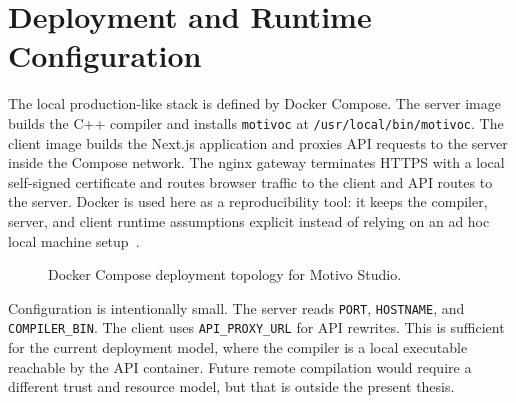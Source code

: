 \section{Deployment and Runtime Configuration}\label{sec:deployment}

The local production-like stack is defined by Docker Compose.
The server image builds the C++ compiler and installs \texttt{motivoc} at \texttt{/usr/local/bin/motivoc}.
The client image builds the Next.js application and proxies API requests to the server inside the Compose network.
The nginx gateway terminates HTTPS with a local self-signed certificate and routes browser traffic to the client and
API routes to the server.
Docker is used here as a reproducibility tool: it keeps the compiler, server, and client runtime assumptions explicit
instead of relying on an ad hoc local machine setup~\cite{Docker_2026}.

\begin{figure}[htbp]
  \centering
  \caption{Docker Compose deployment topology for Motivo Studio.}\label{fig:deployment}
\end{figure}

Configuration is intentionally small.
The server reads \texttt{PORT}, \texttt{HOSTNAME}, and \texttt{COMPILER\_BIN}.
The client uses \texttt{API\_PROXY\_URL} for API rewrites.
This is sufficient for the current deployment model, where the compiler is a local executable reachable by the API
container.
Future remote compilation would require a different trust and resource model, but that is outside the present thesis.
